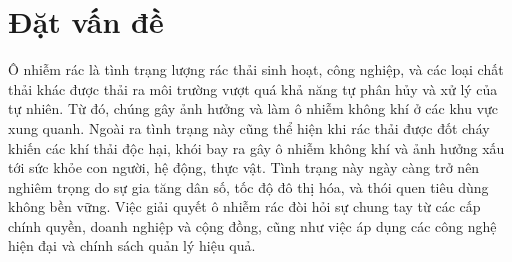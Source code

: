 \documentclass[../the.tex]{subfiles}
\begin{document}
\section{Đặt vấn đề}
\label{tong_quan}

{\fontsize{13}{12} \selectfont

Ô nhiễm rác là tình trạng lượng rác thải sinh hoạt, công nghiệp, và các loại chất thải khác được thải ra môi trường vượt quá khả năng tự phân hủy và xử lý của tự nhiên. Từ đó, chúng gây ảnh hưởng và làm ô nhiễm không khí ở các khu vực xung quanh. Ngoài ra tình trạng này cũng thể hiện khi rác thải được đốt cháy khiến các khí thải độc hại, khói bay ra gây ô nhiễm không khí và ảnh hưởng xấu tới sức khỏe con người, hệ động, thực vật.
Tình trạng này ngày càng trở nên nghiêm trọng do sự gia tăng dân số, tốc độ đô thị hóa, và thói quen tiêu dùng không bền vững. Việc giải quyết ô nhiễm rác đòi hỏi sự chung tay từ các cấp chính quyền, doanh nghiệp và cộng đồng, cũng như việc áp dụng các công nghệ hiện đại và chính sách quản lý hiệu quả. 

}

\bigskip
\end{document}
